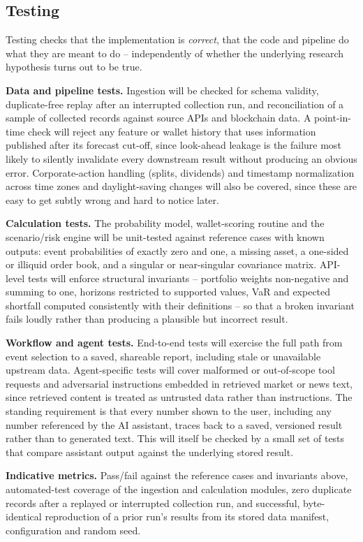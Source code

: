 \clearpage
\subsection{Testing}
Testing checks that the implementation is \emph{correct}, that the code and pipeline do what they are meant to do -- independently of whether the underlying research hypothesis turns out to be true.

\textbf{Data and pipeline tests.} Ingestion will be checked for schema validity, duplicate-free replay after an interrupted collection run, and reconciliation of a sample of collected records against source APIs and blockchain data. A point-in-time check will reject any feature or wallet history that uses information published after its forecast cut-off, since look-ahead leakage is the failure most likely to silently invalidate every downstream result without producing an obvious error. Corporate-action handling (splits, dividends) and timestamp normalization across time zones and daylight-saving changes will also be covered, since these are easy to get subtly wrong and hard to notice later.

\textbf{Calculation tests.} The probability model, wallet-scoring routine and the scenario/risk engine will be unit-tested against reference cases with known outputs: event probabilities of exactly zero and one, a missing asset, a one-sided or illiquid order book, and a singular or near-singular covariance matrix. API-level tests will enforce structural invariants -- portfolio weights non-negative and summing to one, horizons restricted to supported values, VaR and expected shortfall computed consistently with their definitions -- so that a broken invariant fails loudly rather than producing a plausible but incorrect result.

\textbf{Workflow and agent tests.} End-to-end tests will exercise the full path from event selection to a saved, shareable report, including stale or unavailable upstream data. Agent-specific tests will cover malformed or out-of-scope tool requests and adversarial instructions embedded in retrieved market or news text, since retrieved content is treated as untrusted data rather than instructions. The standing requirement is that every number shown to the user, including any number referenced by the AI assistant, traces back to a saved, versioned result rather than to generated text. This will itself be checked by a small set of tests that compare assistant output against the underlying stored result.

\textbf{Indicative metrics.} Pass/fail against the reference cases and invariants above, automated-test coverage of the ingestion and calculation modules, zero duplicate records after a replayed or interrupted collection run, and successful, byte-identical reproduction of a prior run's results from its stored data manifest, configuration and random seed.

